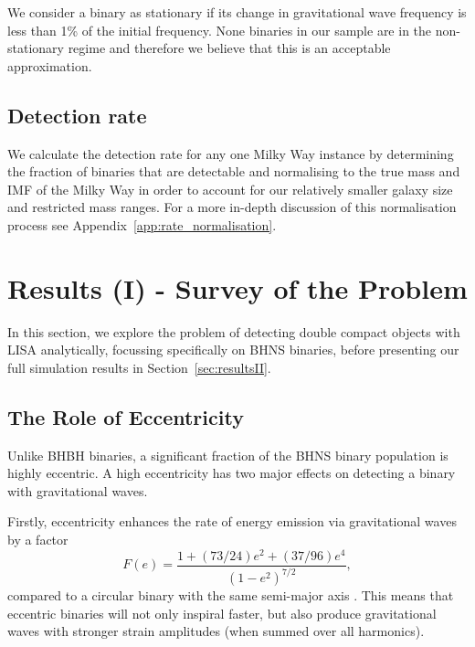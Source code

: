 \documentclass[twocolumn]{aastex63}
\begin{document}
We consider a binary as stationary if its change in gravitational wave frequency is less than 1\% of the initial frequency. None binaries in our sample are in the non-stationary regime and therefore we believe that this is an acceptable approximation.

\subsection{Detection rate}
We calculate the detection rate for any one Milky Way instance by determining the fraction of binaries that are detectable and normalising to the true mass and IMF of the Milky Way in order to account for our relatively smaller galaxy size and restricted mass ranges. For a more in-depth discussion of this normalisation process see Appendix~\ref{app:rate_normalisation}.

\section{Results (I)  - Survey of the Problem} \label{sec:resultsI}

In this section, we explore the problem of detecting double compact objects with LISA analytically, focussing specifically on BHNS binaries, before presenting our full simulation results in Section~\ref{sec:resultsII}.

\subsection{The Role of Eccentricity}\label{sec:eccentricity_role}

Unlike BHBH binaries, a significant fraction of the BHNS binary population is highly eccentric. A high eccentricity has two major effects on detecting a binary with gravitational waves.

Firstly, eccentricity enhances the rate of energy emission via gravitational waves by a factor
\begin{equation}
    F(e) = \frac{1 + (73 / 24) e^2 + (37 / 96) e^4}{(1 - e^2)^{7/2}},
\end{equation}
compared to a circular binary with the same semi-major axis \citep[][Eq.\,17]{Peters+1963}. This means that eccentric binaries will not only inspiral faster, but also produce gravitational waves with stronger strain amplitudes (when summed over all harmonics).
\end{document}
